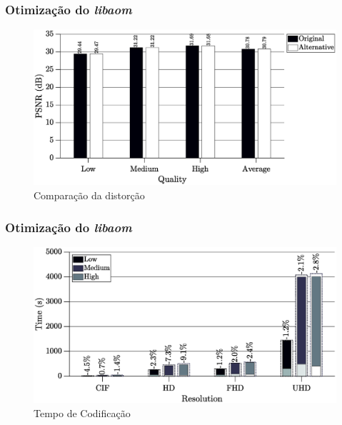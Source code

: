 \documentclass{beamer}
\begin{document}
\begin{frame}
       \frametitle{Otimização do \emph{libaom}}       
       \begin{center}
                     \begin{figure}[h]
                            \centering
                            \includegraphics[width=\textwidth]{Figures/buttmultqual.eps}
                            \caption{Comparação da distorção}
                     \end{figure}
       \end{center}
\end{frame}


\begin{frame}
       \frametitle{Otimização do \emph{libaom}}       
       \begin{center}
                     \begin{figure}[h]
                            \centering
                            \includegraphics[width=\textwidth]{Figures/buttmulttime.eps}
                            \caption{Tempo de Codificação}
                     \end{figure}
       \end{center}
\end{frame}
\end{document}
